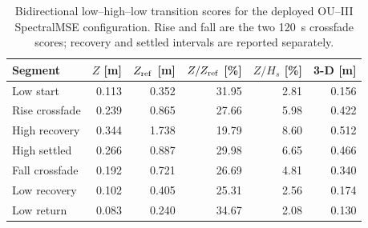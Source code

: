 \begin{table}[t]
  \centering
  \caption{Bidirectional low--high--low transition scores for the deployed OU--III SpectralMSE configuration. Rise and fall are the two \SI{120}{s} crossfade scores; recovery and settled intervals are reported separately.}
  \label{tab:ou-roundtrip-scores}
  \footnotesize
  \setlength{\tabcolsep}{2.7pt}
  \begin{tabular}{@{}lrrrrr@{}}
    \toprule
    Segment & $Z$ [m] & $Z_{\rm ref}$ [m] & $Z/Z_{\rm ref}$ [\%] & $Z/H_s$ [\%] & 3-D [m] \\
    \midrule
    Low start & 0.113 & 0.352 & 31.95 & 2.81 & 0.156 \\
    Rise crossfade & 0.239 & 0.865 & 27.66 & 5.98 & 0.422 \\
    High recovery & 0.344 & 1.738 & 19.79 & 8.60 & 0.512 \\
    High settled & 0.266 & 0.887 & 29.98 & 6.65 & 0.466 \\
    Fall crossfade & 0.192 & 0.721 & 26.69 & 4.81 & 0.340 \\
    Low recovery & 0.102 & 0.405 & 25.31 & 2.56 & 0.174 \\
    Low return & 0.083 & 0.240 & 34.67 & 2.08 & 0.130 \\
    \bottomrule
  \end{tabular}
\end{table}
